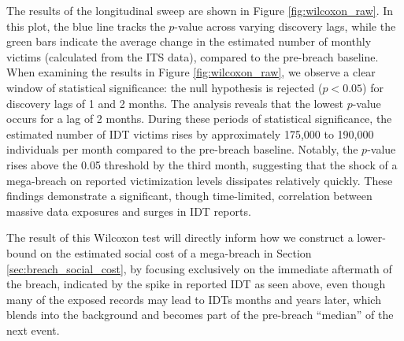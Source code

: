The results of the longitudinal sweep are shown in Figure \ref{fig:wilcoxon_raw}. In this plot, the blue line tracks the $p$-value across varying discovery lags, while the green bars indicate the average change in the estimated number of monthly victims (calculated from the ITS  data), compared to the pre-breach baseline. When examining the results in Figure \ref{fig:wilcoxon_raw}, we observe a clear window of statistical significance: the null hypothesis is rejected ($p<0.05$) for discovery lags of 1 and 2 months. The analysis reveals that the lowest $p$-value occurs for a lag of 2 months. During these periods of statistical significance, the estimated number of IDT victims rises by approximately 175,000 to 190,000 individuals per month compared to the pre-breach baseline. Notably, the $p$-value rises above the 0.05 threshold by the third month, suggesting that the shock of a mega-breach on reported victimization levels dissipates relatively quickly. These findings demonstrate a significant, though time-limited, correlation between massive data exposures and surges in IDT reports. 

The result of this Wilcoxon test will directly inform how we construct a lower-bound on the estimated social cost of a mega-breach in Section \ref{sec:breach_social_cost}, by focusing exclusively on the immediate aftermath of the breach, indicated by the spike in reported IDT as seen above, even though many of the exposed records may lead to IDTs months and years later, which blends into the background and becomes part of the pre-breach ``median'' of the next event.



